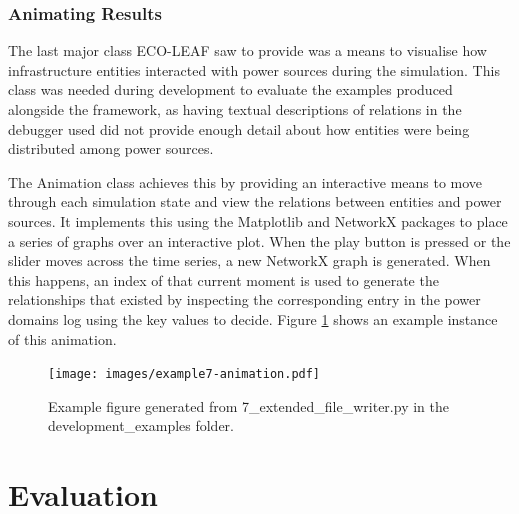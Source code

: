 \documentclass{l4proj}
\begin{document}
\subsection{Animating Results}\label{subsec:imp:animation}
The last major class ECO-LEAF saw to provide was a means to visualise how infrastructure entities interacted with power sources during the simulation.
This class was needed during development to evaluate the examples produced alongside the framework, as having textual descriptions of relations in the debugger used did not provide enough detail about how entities were being distributed among power sources.

The Animation class achieves this by providing an interactive means to move through each simulation state and view the relations between entities and power sources.
It implements this using the Matplotlib and NetworkX packages to place a series of graphs over an interactive plot.
When the play button is pressed or the slider moves across the time series, a new NetworkX graph is generated.
When this happens, an index of that current moment is used to generate the relationships that existed by inspecting the corresponding entry in the power domains log using the key values to decide.
Figure \ref{fig:dev-example7-animation} shows an example instance of this animation.
\begin{figure}[h]
    \centering
    \texttt{[image: images/example7-animation.pdf]}
    ~
    \caption{Example figure generated from 7\_extended\_file\_writer.py in the development\_examples folder.}
    \label{fig:dev-example7-animation}
\end{figure}


\chapter{Evaluation} \label{chp:evaluation}
\end{document}

